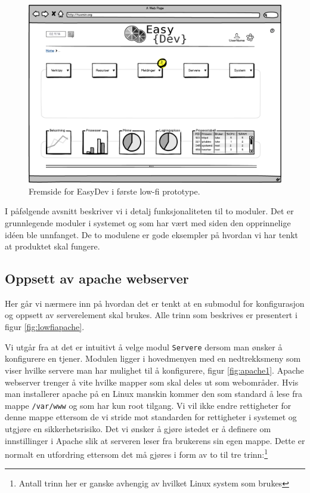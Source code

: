 \begin{figure}
\includegraphics[width=\textwidth,height=\textheight,keepaspectratio]{./img/prosessdokumentasjon/lowfi/fremside.png}
\caption[Low-fi prototype]{Fremside for EasyDev i første low-fi prototype.}
\label{fig:lowfi_fremside}
\end{figure}


I påfølgende avsnitt beskriver vi i detalj funksjonaliteten til to moduler. Det er grunnlegende moduler i systemet og som har vært med siden den opprinnelige idéen ble unnfanget. De to modulene er gode eksempler på hvordan vi har tenkt at produktet skal fungere.

\subsection{Oppsett av apache webserver}
Her går vi nærmere inn på hvordan det er tenkt at en submodul for konfigurasjon og oppsett av serverelement skal brukes. Alle trinn som beskrives er presentert i figur \ref{fig:lowfiapache}.

Vi utgår fra at det er intuitivt å velge modul \texttt{Servere} dersom man ønsker å konfigurere en tjener. Modulen ligger i hovedmenyen med en nedtrekksmeny som viser hvilke servere man har mulighet til å konfigurere, figur \ref{fig:apache1}. 
Apache webserver trenger å vite hvilke mapper som skal deles ut som webområder. Hvis man installerer apache på en Linux manskin kommer den som standard å lese fra mappe \texttt{/var/www} og som har kun root tilgang. Vi vil ikke endre rettigheter for denne mappe ettersom de vi stride mot standarden for rettigheter i systemet og utgjøre en sikkerhetsrisiko.\cite{book:unixprog}
Det vi ønsker å gjøre istedet er å definere om innstillinger i Apache slik at serveren leser fra brukerens sin egen mappe. Dette er normalt en utfordring ettersom det må gjøres i form av to til tre trinn:\footnote{Antall trinn her er ganske avhengig av hvilket Linux system som brukes}


